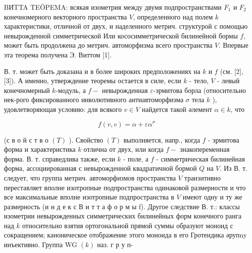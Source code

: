 \documentclass[10pt]{article}
\begin{document}
BИTTA TEÖPEMA: всякая изометрия между двумя подпространствами $F_{1}$ и $F_{2}$ конечномерного векторного пространства $V$, определенного над полем $k$ характеристики, отличной от двух, и наделенного метрич. структурой с помощью невырожденной симметрической Или кососимметрической билинейной бормы $f$, может быть продолжена до метрич. автоморфизма всего пространства $V$. Впервые эта теорема получена Э. Виттом [1].



В. т. может быть доказана и в более широких предположениях на $k$ и $f$ (см. [2], [3]). А именно, утверждение теоремы остается в силе, если $k$ - тело, $V$ - левый конечномерный $k$-модуль, а $f-$ невырожденная $\varepsilon$-эрмитова борла (относительно нек-рого фиксированного инволютивного антиавтоморфизма $\sigma$ тела $k$ ), удовлетворяющая условию: для всякого $v \in V$ найдется такой әлемент $\alpha \in k$, что



\[

f(v, v)=\alpha+\varepsilon \alpha^{\sigma}

\]



(с в о й с т в о $(T)$ ). Свойство $(T)$ выполняется, напр., когда $f$ - эрмитова форма и характеристика $k$ отлична от двух, или когда $f-$ знакопеременная форма. В. т. справедлива также, если $k$ - поле, а $f$ - симметрическая билинейная форма, ассоциированная с невырожденной квадратичной бормой $Q$ на $V$. Из В. т. следует, что группа метрич. автоморфизмов пространства $V$ транзитивно переставляет вполне изотропные подпространства одинаковой размерности и что все максимальные вполне изотропные подпространства в $V$ имеют одну и ту же размерность (и н д е к с В и т т а ф о р м ы f). Другое следствие В. т.: классы изометрии невырожденных симметрических билинейных форм конечного ранга над $k$ относительно взятия ортогональной прямой суммы образуют моноид с сокращением; каноническое отображение этого моноида в его Гротендика әрупny инъективно. Группа WG $(k)$ наз. г р у п-
\end{document}
